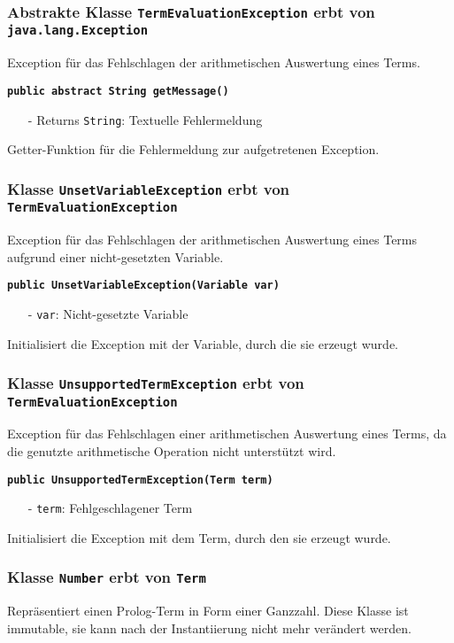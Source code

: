 \documentclass[parskip=full,11pt,twoside]{scrartcl}
\begin{document}
\subsubsection{Abstrakte Klasse \texttt{TermEvaluationException} erbt von\\\texttt{java.lang.Exception}}
Exception für das Fehlschlagen der arithmetischen Auswertung eines Terms.

\textbf{\texttt{public abstract String getMessage()}}
\begin{itemize}[noitemsep]
	\item[-] Returns \texttt{String}: Textuelle Fehlermeldung
\end{itemize}
Getter-Funktion für die Fehlermeldung zur aufgetretenen Exception.

\subsubsection{Klasse \texttt{UnsetVariableException} erbt von\\\texttt{TermEvaluationException}}
Exception für das Fehlschlagen der arithmetischen Auswertung eines Terms aufgrund einer nicht-gesetzten Variable.

\textbf{\texttt{public UnsetVariableException(Variable var)}}
\begin{itemize}[noitemsep]
	\item[-] \texttt{var}: Nicht-gesetzte Variable
\end{itemize}
Initialisiert die Exception mit der Variable, durch die sie erzeugt wurde.

\subsubsection{Klasse \texttt{UnsupportedTermException} erbt von\\\texttt{TermEvaluationException}}
Exception für das Fehlschlagen einer arithmetischen Auswertung eines Terms, da die genutzte arithmetische Operation nicht unterstützt wird.

\textbf{\texttt{public UnsupportedTermException(Term term)}}
\begin{itemize}[noitemsep]
	\item[-] \texttt{term}: Fehlgeschlagener Term
\end{itemize}
Initialisiert die Exception mit dem Term, durch den sie erzeugt wurde.

\subsubsection{Klasse \texttt{Number} erbt von \texttt{Term}}
Repräsentiert einen Prolog-Term in Form einer Ganzzahl. Diese Klasse ist immutable, sie kann nach der Instantiierung nicht mehr verändert werden.
\end{document}
